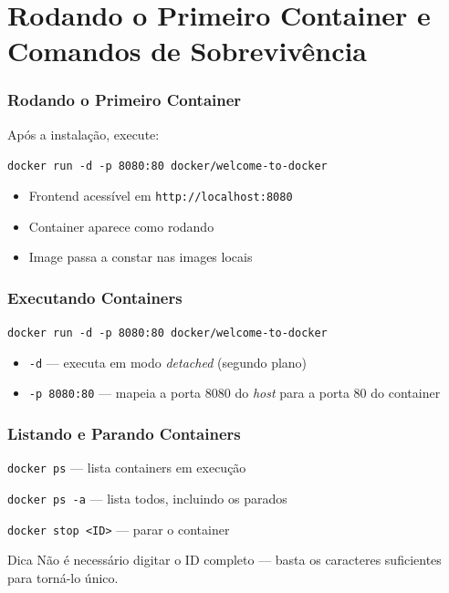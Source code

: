 \section{Rodando o Primeiro Container e Comandos de Sobrevivência}

\begin{frame}
  \frametitle{Rodando o Primeiro Container}
  Após a instalação, execute:

  \vspace{0.5em}
  \texttt{docker run -d -p 8080:80 docker/welcome-to-docker}

  \vspace{0.5em}
  \begin{itemize}
    \item Frontend acessível em \texttt{http://localhost:8080}
    \item Container aparece como rodando
    \item Image passa a constar nas images locais
  \end{itemize}
\end{frame}

\begin{frame}
  \frametitle{Executando Containers}
  \texttt{docker run -d -p 8080:80 docker/welcome-to-docker}

  \vspace{0.5em}
  \begin{itemize}
    \item \texttt{-d} — executa em modo \textit{detached} (segundo plano)
    \item \texttt{-p 8080:80} — mapeia a porta 8080 do \textit{host} para a porta 80 do container
  \end{itemize}
\end{frame}

\begin{frame}
  \frametitle{Listando e Parando Containers}
  \texttt{docker ps} \hspace{1em} — lista containers em execução

  \vspace{0.3em}
  \texttt{docker ps -a} \hspace{0.5em} — lista todos, incluindo os parados

  \vspace{0.8em}
  \texttt{docker stop <ID>} — parar o container

  \vspace{0.5em}
  \begin{block}{Dica}
    Não é necessário digitar o ID completo — basta os caracteres suficientes
    para torná-lo único.
  \end{block}
\end{frame}

